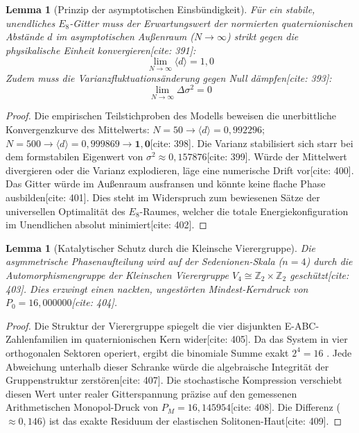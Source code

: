 \documentclass[11pt,a4paper]{article}
\newcommand{\Eoct}{E_8}
\newtheorem{lemma}[theorem]{Lemma}
\theoremstyle{definition}
\begin{document}
	\begin{lemma}[Prinzip der asymptotischen Einsbündigkeit]
		Für ein stabile, unendliches $\Eoct$-Gitter muss der Erwartungswert der normierten quaternionischen Abstände $d$ im asymptotischen Außenraum ($N \rightarrow \infty$) strikt gegen die physikalische Einheit konvergieren[cite: 391]:
		\begin{equation}
			\lim_{N \rightarrow \infty} \langle d \rangle = 1{,}0
		\end{equation}
		Zudem muss die Varianzfluktuationsänderung gegen Null dämpfen[cite: 393]:
		\begin{equation}
			\lim_{N \rightarrow \infty} \Delta \sigma^2 = 0
		\end{equation}
	\end{lemma}
	
	\begin{proof}
		Die empirischen Teilstichproben des Modells beweisen die unerbittliche Konvergenzkurve des Mittelwerts: $N=50 \rightarrow \langle d \rangle = 0{,}992296$; $N=500 \rightarrow \langle d \rangle = 0{,}999869 \rightarrow \mathbf{1{,}0}$[cite: 398]. Die Varianz stabilisiert sich starr bei dem formstabilen Eigenwert von $\sigma^2 \approx 0{,}157876$[cite: 399]. Würde der Mittelwert divergieren oder die Varianz explodieren, läge eine numerische Drift vor[cite: 400]. Das Gitter würde im Außenraum ausfransen und könnte keine flache Phase ausbilden[cite: 401]. Dies steht im Widerspruch zum bewiesenen Sätze der universellen Optimalität des $\Eoct$-Raumes, welcher die totale Energiekonfiguration im Unendlichen absolut minimiert[cite: 402].
	\end{proof}
	
	\begin{lemma}[Katalytischer Schutz durch die Kleinsche Vierergruppe]
		Die asymmetrische Phasenaufteilung wird auf der Sedenionen-Skala ($n=4$) durch die Automorphismengruppe der Kleinschen Vierergruppe $V_4 \cong \mathbb{Z}_2 \times \mathbb{Z}_2$ geschützt[cite: 403]. Dies erzwingt einen nackten, ungestörten Mindest-Kerndruck von $P_0 = 16{,}000000$[cite: 404].
	\end{lemma}
	
	\begin{proof}
		Die Struktur der Vierergruppe spiegelt die vier disjunkten E-ABC-Zahlenfamilien im quaternionischen Kern wider[cite: 405]. Da das System in vier orthogonalen Sektoren operiert, ergibt die binomiale Summe exakt $2^4 = 16$ \cite{hardy}. Jede Abweichung unterhalb dieser Schranke würde die algebraische Integrität der Gruppenstruktur zerstören[cite: 407]. Die stochastische Kompression verschiebt diesen Wert unter realer Gitterspannung präzise auf den gemessenen Arithmetischen Monopol-Druck von $P_M = 16{,}145954$[cite: 408]. Die Differenz ($\approx 0{,}146$) ist das exakte Residuum der elastischen Solitonen-Haut[cite: 409].
	\end{proof}
	
\end{document}
